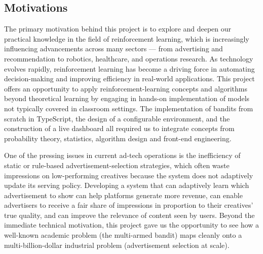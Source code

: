 \subsection{Motivations}
The primary motivation behind this project is to explore and deepen our practical knowledge in the field of reinforcement learning, which is increasingly influencing advancements across many sectors --- from advertising and recommendation to robotics, healthcare, and operations research. As technology evolves rapidly, reinforcement learning has become a driving force in automating decision-making and improving efficiency in real-world applications. This project offers an opportunity to apply reinforcement-learning concepts and algorithms beyond theoretical learning by engaging in hands-on implementation of models not typically covered in classroom settings. The implementation of bandits from scratch in TypeScript, the design of a configurable environment, and the construction of a live dashboard all required us to integrate concepts from probability theory, statistics, algorithm design and front-end engineering.

One of the pressing issues in current ad-tech operations is the inefficiency of static or rule-based advertisement-selection strategies, which often waste impressions on low-performing creatives because the system does not adaptively update its serving policy. Developing a system that can adaptively learn which advertisement to show can help platforms generate more revenue, can enable advertisers to receive a fair share of impressions in proportion to their creatives' true quality, and can improve the relevance of content seen by users. Beyond the immediate technical motivation, this project gave us the opportunity to see how a well-known academic problem (the multi-armed bandit) maps cleanly onto a multi-billion-dollar industrial problem (advertisement selection at scale).

